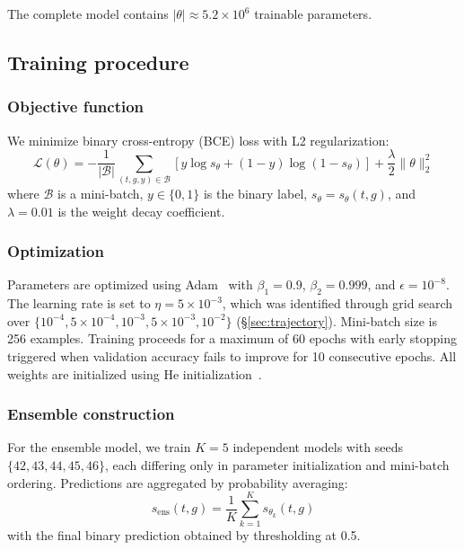 \documentclass[10pt,twocolumn]{article}
\begin{document}
The complete model contains $|\theta| \approx 5.2 \times 10^6$ trainable parameters.

\subsection{Training procedure}
\label{sec:training}

\subsubsection{Objective function}

We minimize binary cross-entropy (BCE) loss with L2 regularization:
\begin{equation}
    \mathcal{L}(\theta) = -\frac{1}{|\mathcal{B}|}\sum_{(t,g,y) \in \mathcal{B}} \left[y \log s_\theta + (1{-}y) \log(1{-}s_\theta)\right] + \frac{\lambda}{2}\|\theta\|_2^2
\end{equation}
where $\mathcal{B}$ is a mini-batch, $y \in \{0,1\}$ is the binary label, $s_\theta = s_\theta(t,g)$, and $\lambda = 0.01$ is the weight decay coefficient.

\subsubsection{Optimization}

Parameters are optimized using Adam~\cite{kingma2015adam} with $\beta_1 = 0.9$, $\beta_2 = 0.999$, and $\epsilon = 10^{-8}$.
The learning rate is set to $\eta = 5 \times 10^{-3}$, which was identified through grid search over $\{10^{-4}, 5 \times 10^{-4}, 10^{-3}, 5 \times 10^{-3}, 10^{-2}\}$ (\S\ref{sec:trajectory}).
Mini-batch size is 256 examples.
Training proceeds for a maximum of 60 epochs with early stopping triggered when validation accuracy fails to improve for 10 consecutive epochs.
All weights are initialized using He initialization~\cite{he2015delving}.

\subsubsection{Ensemble construction}

For the ensemble model, we train $K = 5$ independent models with seeds $\{42, 43, 44, 45, 46\}$, each differing only in parameter initialization and mini-batch ordering.
Predictions are aggregated by probability averaging:
\begin{equation}
    s_{\text{ens}}(t, g) = \frac{1}{K}\sum_{k=1}^{K} s_{\theta_k}(t, g)
\end{equation}
with the final binary prediction obtained by thresholding at 0.5.
\end{document}
